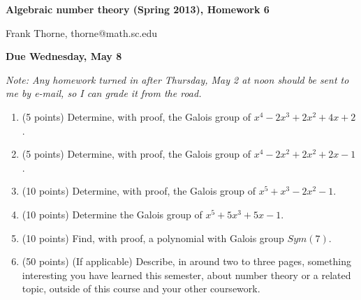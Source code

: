 \documentclass[12pt]{article}
\begin{document}
\setlength{\topmargin}{-2mm}





\begin{center}{\bf Algebraic number theory (Spring 2013), Homework 6}
\end{center}
\begin{center}Frank Thorne, thorne@math.sc.edu
\end{center}
\begin{center}
{\bf Due Wednesday, May 8}
\end{center}

{\itshape Note: Any homework turned in after Thursday, May 2 at noon should be sent to me by e-mail,
so I can grade it from the road.}

\begin{enumerate}
\item (5 points)
Determine, with proof, the Galois group of $x^4 - 2x^3 + 2x^2 + 4x + 2$.

\item (5 points)
Determine, with proof, the Galois group of $x^4 - 2x^2 + 2x^2 + 2x - 1$.

\item (10 points)
Determine, with proof, the Galois group of 
$x^5 + x^3 - 2x^2 - 1$.

\item (10 points)
Determine the Galois group of
$x^5 + 5x^3 + 5x - 1$.

\item (10 points)
Find, with proof, a polynomial with Galois group $Sym(7)$.

\item (50 points)
(If applicable) Describe, in around two to three pages, something interesting you have learned this semester,
about number theory or a related topic, outside of this course and your other coursework.

\end{enumerate}
\end{document}
